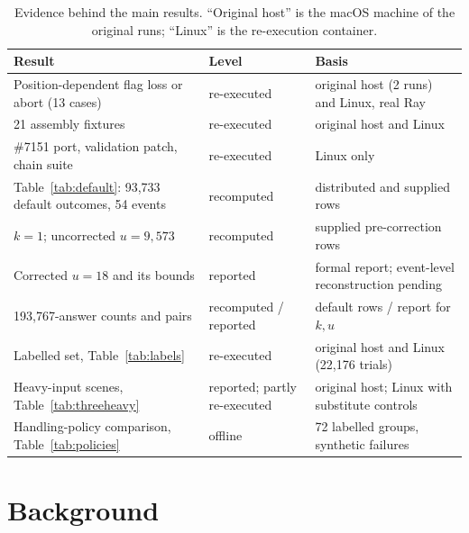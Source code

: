 \documentclass[10pt,a4paper]{article}
\begin{document}
\begin{table}[t]
\centering
\caption{Evidence behind the main results. ``Original host'' is the macOS
machine of the original runs; ``Linux'' is the re-execution container.}
\label{tab:evidence}
\small
\begin{tabular}{@{}p{5.6cm}p{2.3cm}p{5.0cm}@{}}
\toprule
Result & Level & Basis \\
\midrule
Position-dependent flag loss or abort (13 cases) & re-executed & original host (2 runs) and Linux, real Ray \\
21 assembly fixtures & re-executed & original host and Linux \\
\#7151 port, validation patch, chain suite & re-executed & Linux only \\
Table~\ref{tab:default}: 93,733 default outcomes, 54 events & recomputed & distributed and supplied rows \\
$k=1$; uncorrected $u=9{,}573$ & recomputed & supplied pre-correction rows \\
Corrected $u=18$ and its bounds & reported & formal report; event-level reconstruction pending \\
193,767-answer counts and pairs & recomputed / reported & default rows / report for $k,u$ \\
Labelled set, Table~\ref{tab:labels} & re-executed & original host and Linux (22,176 trials) \\
Heavy-input scenes, Table~\ref{tab:threeheavy} & reported; partly re-executed & original host; Linux with substitute controls \\
Handling-policy comparison, Table~\ref{tab:policies} & offline & 72 labelled groups, synthetic failures \\
\bottomrule
\end{tabular}
\end{table}

\section{Background}
\label{sec:background}
\end{document}
